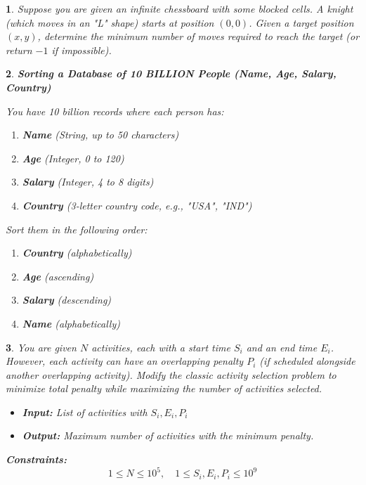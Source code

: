 \documentclass[%
addpoints]{exam}
\theoremstyle{problem}
\newtheorem{p}{}
\begin{document}
\begin{p}
Suppose you are given an infinite chessboard with some blocked cells. A knight (which moves in an "L" shape) starts at position $(0,0)$. Given a target position $(x, y)$, determine the minimum number of moves required to reach the target (or return $-1$ if impossible).
\hfill\end{p}

\begin{p}
\textbf{Sorting a Database of 10 BILLION People (Name, Age, Salary, Country)}

You have 10 billion records where each person has:

\begin{enumerate}
    \item \textbf{Name} (String, up to 50 characters)
    \item \textbf{Age} (Integer, 0 to 120)
    \item \textbf{Salary} (Integer, 4 to 8 digits)
    \item \textbf{Country} (3-letter country code, e.g., "USA", "IND")
\end{enumerate}

Sort them in the following order:

\begin{enumerate}
    \item[\textcircled{1}] \textbf{Country} (alphabetically)
    \item[\textcircled{2}] \textbf{Age} (ascending)
    \item[\textcircled{3}] \textbf{Salary} (descending)
    \item[\textcircled{4}] \textbf{Name} (alphabetically)
\end{enumerate}
\hfill\end{p}



\begin{p}
You are given $N$ activities, each with a start time $S_i$ and an end time $E_i$. However, each activity can have an overlapping penalty $P_i$ (if scheduled alongside another overlapping activity). Modify the classic activity selection problem to minimize total penalty while maximizing the number of activities selected.

\begin{itemize}
    \item \textbf{Input:} List of activities with $S_i, E_i, P_i$
    \item \textbf{Output:} Maximum number of activities with the minimum penalty.
\end{itemize}

\textbf{Constraints:} 
\[
1 \leq N \leq 10^5, \quad 1 \leq S_i, E_i, P_i \leq 10^9
\]
\hfill\end{p}
\end{document}
